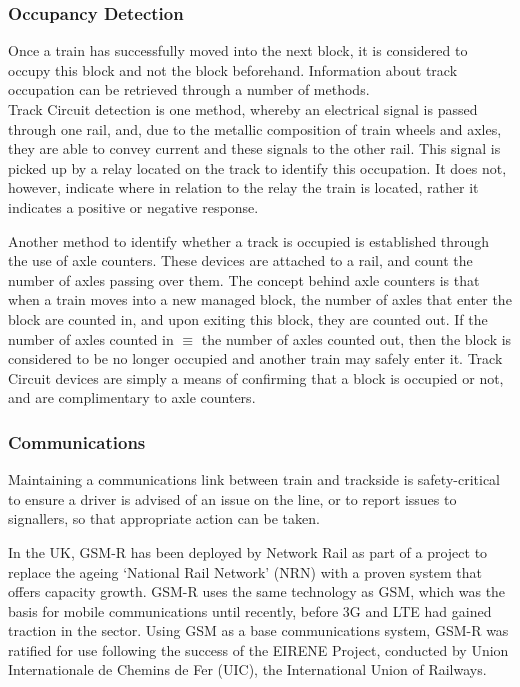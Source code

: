 \documentclass[twoside,11pt,a4paper]{article}
\begin{document}
\subsubsection{Occupancy Detection}
Once a train has successfully moved into the next block, it is considered to occupy this block and not the block beforehand. Information about track occupation can be retrieved through a number of methods.\\Track Circuit detection is one method, whereby an electrical signal is passed through one rail, and, due to the metallic composition of train wheels and axles, they are able to convey current and these signals to the other rail. This signal is picked up by a relay located on the track to identify this occupation. It does not, however, indicate where in relation to the relay the train is located, rather it indicates a positive or negative response.

Another method to identify whether a track is occupied is established through the use of axle counters. These devices are attached to a rail, and count the number of axles passing over them. The concept behind axle counters is that when a train moves into a new managed block, the number of axles that enter the block are counted in, and upon exiting this block, they are counted out. If the number of axles counted in $\equiv$ the number of axles counted out, then the block is considered to be no longer occupied and another train may safely enter it. Track Circuit devices are simply a means of confirming that a block is occupied or not, and are complimentary to axle counters.
\subsubsection{Communications}
Maintaining a communications link between train and trackside is safety-critical to ensure a driver is advised of an issue on the line, or to report issues to signallers, so that appropriate action can be taken.

In the UK, GSM-R has been deployed by Network Rail as part of a project to replace the ageing `National Rail Network' (NRN) with a proven system that offers capacity growth. GSM-R uses the same technology as GSM, which was the basis for mobile communications until recently, before 3G and LTE had gained traction in the sector. Using GSM as a base communications system, GSM-R was ratified for use following the success of the EIRENE Project, conducted by Union Internationale de Chemins de Fer (UIC), the International Union of Railways.
\end{document}
